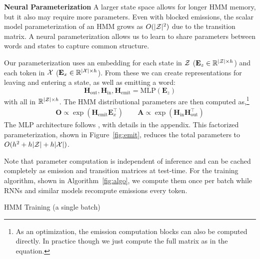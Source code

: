 \documentclass[11pt,a4paper]{article}
\begin{document}
\vspace{0.2cm}

\noindent
\textbf{Neural Parameterization}
A larger state space allows for longer HMM memory, but it also may require 
more parameters. Even with blocked emissions, the scalar model parameterization of an HMM grows as $O(|\mathcal{Z}|^2)$ due to the transition matrix. A neural parameterization allows us to 
learn to share parameters between words and states to capture common structure. 

Our parameterization uses an embedding for each state in $\mathcal{Z}$ ($\mathbf{E}_z \in \mathbb{R}^{|\mathcal{Z}| \times h}$)
and each token in $\mathcal{X}$ ($\mathbf{E}_x \in \mathbb{R}^{|\mathcal{X}| \times h}$).
From these we can create representations for leaving and entering a state,
as well as emitting a word: 
\[ \mathbf{H}_{\textrm{out}},\mathbf{H}_{\textrm{in}},\mathbf{H}_\textrm{emit}
 = \text{MLP}( \mathbf{E}_z ) \] 
with all in $\mathbb{R}^{|\mathcal{Z}|\times h}$.
The HMM distributional parameters are then computed as,\footnote{As an optimization, the emission computation blocks can also be computed directly. In practice though we just compute the full matrix as in the equation.} 
\begin{equation}
\begin{aligned}
\mathbf{O} \propto \exp (\mathbf{H}_\textrm{emit}\mathbf{E}_x ^\top) \qquad
\mathbf{A} \propto \exp (\mathbf{H}_\textrm{in}\mathbf{H}_\textrm{out}^\top)
\end{aligned}
\end{equation}
The MLP architecture follows \citet{kim2019cpcfg}, with details in the appendix.
This factorized parameterization, shown in Figure~\ref{fig:emit}, reduces the total parameters to  $O(h^2 + h|\mathcal{Z}| + h|\mathcal{X}|)$.

Note that parameter computation is independent of inference
and can be cached completely as emission and transition matrices at test-time.
For the training algorithm, shown in Algorithm~\ref{fig:algo}, we compute them once per batch
while RNNs and similar models recompute emissions every token.

\begin{algorithm}[t]
\begin{algorithmic}
    \EndFor
\end{algorithmic}
\caption{
\label{fig:algo}
HMM Training (a single batch)
}
\end{algorithm}
\end{document}
